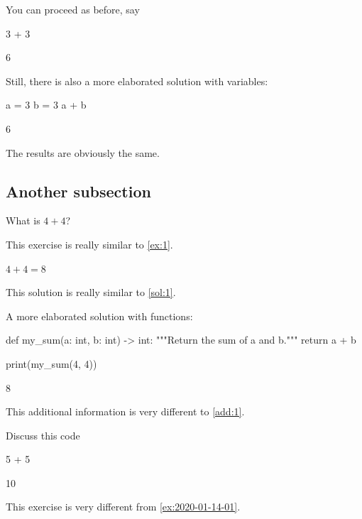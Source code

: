\documentclass[oneside]{book}
\begin{document}
\begin{additionalinformation}
You can proceed as before, say
\begin{pycell}
3 + 3
\end{pycell}
\begin{pyexpectedoutput}
6
\end{pyexpectedoutput}

Still, there is also a more elaborated solution with variables:

\begin{pycell}
a = 3
b = 3
a + b
\end{pycell}
\begin{pyexpectedoutput}
6
\end{pyexpectedoutput}

The results are obviously the same.
\end{additionalinformation}

\subsection{Another subsection}

\begin{exercise}
  What is \(4 + 4\)?

  This exercise is really similar to \cref{ex:1}.
\end{exercise}

\begin{solution}
  \(4 + 4 = 8\)

  This solution is really similar to \cref{sol:1}.
\end{solution}

\begin{additionalinformation}
A more elaborated solution with functions:

\begin{pycell}
def my_sum(a: int, b: int) -> int:
    """Return the sum of a and b."""
    return a + b


print(my_sum(4, 4))
\end{pycell}
\begin{pyexpectedoutput}
8
\end{pyexpectedoutput}

This additional information is very different to \cref{add:1}.
\end{additionalinformation}

\begin{exercise}[examdate={January 15, 2020}, examproblemnumber={1}, examproblemid={2020-01-15-01}]
Discuss this code

\begin{pycell}
5 + 5
\end{pycell}
\begin{pyexpectedoutput}
10
\end{pyexpectedoutput}

This exercise is very different from \cref{ex:2020-01-14-01}.
\end{exercise}
\end{document}
